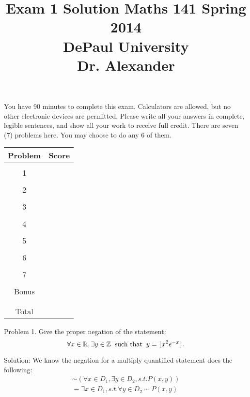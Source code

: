 \documentclass[16 pt]{amsart}
\theoremstyle{definition}
\theoremstyle{remark}
\numberwithin{equation}{subsection}
\newcommand{\R}{\mathbb{R}}
\newcommand{\Z}{\mathbb{Z}}
\begin{document}
\title{Exam 1 Solution Maths 141 Spring 2014 \\ DePaul University\\Dr. Alexander}
\maketitle
You have 90 minutes to complete this exam.  Calculators are allowed, but no other electronic devices are permitted.  Please write all your answers in complete, legible sentences, and show all your work to receive full credit.  There are seven (7) problems here.  You may choose to do any 6 of them.  
\vspace{1in}


\begin{center}
  \begin{tabular}{ c | c }
    Problem & Score\\
    \hline
    &\\
    1&\\
    &\\
    2&\\
    &\\
    3&\\
    &\\
    4&\\
    &\\
    5&\\
    &\\
    6&\\
    &\\
    7&\\
    &\\
    Bonus&\\
    &\\
    \hline 
    &\\    
    Total& 
 \end{tabular}
\end{center}

\newpage 
Problem 1. Give the proper negation of the statement:
\[
\forall x\in\R, \exists y\in\Z \hspace{2mm} \text{such that} \hspace{2mm} y=\lfloor x^{2}e^{-x}\rfloor.
\]

Solution: We know the negation for a multiply quantified statement does the following:
\begin{eqnarray*}
\sim(\forall x\in D_1, \exists y\in D_2, s.t. P(x,y))\\
\equiv \exists x\in D_1, s.t. \forall y\in D_2 \sim P(x,y)
\end{eqnarray*}
\end{document}

